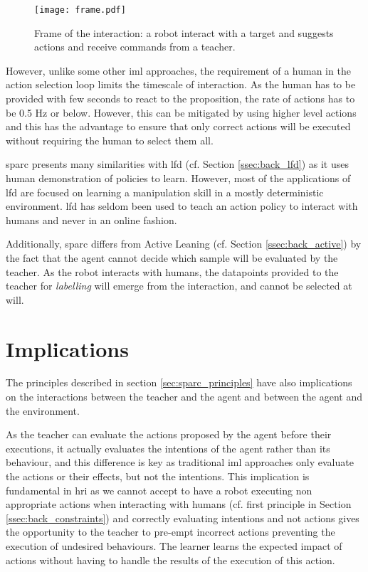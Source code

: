 \begin{figure}[ht]
	\texttt{[image: frame.pdf]}
	\centering
	\caption{Frame of the interaction: a robot interact with a target and suggests actions and receive commands from a teacher.}
	\label{fig:frame}
\end{figure}

However, unlike some other \gls{iml} approaches, the requirement of a human in the action selection loop limits the timescale of interaction. As the human has to be provided with few seconds to react to the proposition, the rate of actions has to be 0.5 Hz or below. However, this can be mitigated by using higher level actions and this has the advantage to ensure that only correct actions will be executed without requiring the human to select them all.

\gls{sparc} presents many similarities with \acrlong{lfd} (cf. Section \ref{ssec:back_lfd}) as it uses human demonstration of policies to learn. However, most of the applications of \gls{lfd} \citep{argall2009survey,billard2008robot} are focused on learning a manipulation skill in a mostly deterministic environment. \gls{lfd} has seldom been used to teach an action policy to interact with humans \citep{liu2014train,sequeira2016discovering} and never in an online fashion.

Additionally, \gls{sparc} differs from Active Leaning (cf. Section \ref{ssec:back_active}) by the fact that the agent cannot decide which sample will be evaluated by the teacher. As the robot interacts with humans, the datapoints provided to the teacher for \textit{labelling} will emerge from the interaction, and cannot be selected at will. 
    
\section{Implications}

The principles described in section \ref{sec:sparc_principles} have also implications on the interactions between the teacher and the agent and between the agent and the environment.

As the teacher can evaluate the actions proposed by the agent before their executions, it actually evaluates the intentions of the agent rather than its behaviour, and this difference is key as traditional \gls{iml} approaches only evaluate the actions or their effects, but not the intentions. This implication is fundamental in \gls{hri} as we cannot accept to have a robot executing non appropriate actions when interacting with humans (cf. first principle in Section \ref{ssec:back_constraints}) and correctly evaluating intentions and not actions gives the opportunity to the teacher to pre-empt incorrect actions preventing the execution of undesired behaviours. The  learner learns the expected impact of actions without having to handle the results of the execution of this action.

